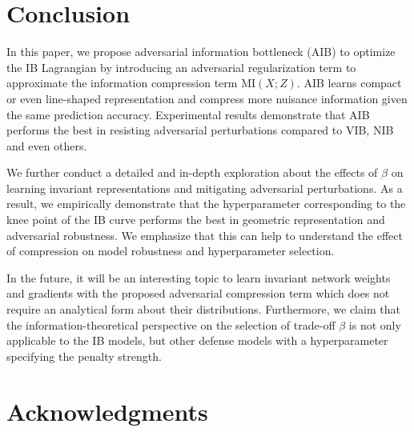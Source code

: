 \documentclass[10pt,journal,compsoc]{IEEEtran}
\begin{document}
\section{Conclusion}
In this paper, we propose adversarial information bottleneck (AIB) to optimize the IB Lagrangian by introducing an adversarial regularization term to approximate the information compression term $\mathrm{MI}(X;Z)$.
AIB learns compact or even line-shaped representation and compress more nuisance information given the same prediction accuracy. Experimental results demonstrate that AIB performs the best in resisting adversarial perturbations compared to VIB, NIB and even others.


We further conduct a detailed and in-depth exploration about the effects of $\beta$ on learning invariant representations and mitigating adversarial perturbations. As a result, we empirically demonstrate that the hyperparameter corresponding to the knee point of the IB curve performs the best in geometric representation and adversarial robustness. We emphasize that this can help to understand the effect of compression on model robustness and hyperparameter selection.

In the future, it will be an interesting topic to learn invariant network weights and gradients with the proposed adversarial compression term which does not require an analytical form about their distributions. Furthermore, we claim that the information-theoretical perspective on the selection of trade-off $\beta$ is not only applicable to the IB models, but other defense models with a hyperparameter specifying the penalty strength. %


\ifCLASSOPTIONcompsoc
  \section*{Acknowledgments}
\else
\end{document}
